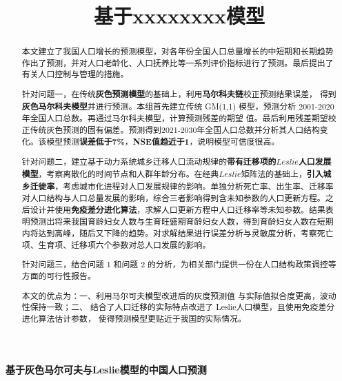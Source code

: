 \documentclass{whutmod}
\title{基于xxxxxxxx模型}
\begin{document}

\begin{center}
	\vspace{4pt}
	{\normalfont \LARGE \textbf{基于灰色马尔可夫与Leslie模型的中国人口预测} }\par
	\vspace{4pt}
	\noindent
\end{center}

	\begin{abstract}
		本文建立了我国人口增长的预测模型，对各年份全国人口总量增长的中短期和长期趋势作出了预测，并对人口老龄化、人口抚养比等一系列评价指标进行了预测。最后提出了有关人口控制与管理的措施。
		\vspace{7pt}	%
		
		针对问题一，在传统\textbf{灰色预测模型}的基础上，利用\textbf{马尔科夫链}校正预测结果误差， 得到\textbf{灰色马尔科夫模型}并进行预测。本组首先建立传统 GM(1,1) 模型，预测分析 2001-2020 年全国人口总数。再通过马尔科夫模型，计算预测残差的期望 值。最后利用残差期望校正传统灰色预测的固有偏差。预测得到2021-2030年全国人口总数并分析其人口结构变化。该模型预测\textbf{误差低于7\%}，\textbf{NSE值趋近于1}，说明模型可信度很高。
	
		\vspace{7pt}	%
	
		针对问题二，建立基于动力系统城乡迁移人口流动规律的\textbf{带有迁移项的$Leslie$人口发展模型}，考察离散化的时间节点和人群年龄分布。在经典$Leslie$矩阵法的基础上，\textbf{引入城乡迁徙率}，考虑城市化进程对人口发展规律的影响。单独分析死亡率、出生率、迁移率对人口结构与人口总量发展的影响，综合三者影响得到含未知参数的人口更新方程。之后设计并使用\textbf{免疫差分进化算法}，求解人口更新方程中人口迁移率等未知参数。结果表明预测出将来我国育龄妇女人数与生育旺盛期育龄妇女人数，得到育龄妇女人数在短期内将达到高峰，随后又下降的趋势。对求解结果进行误差分析与灵敏度分析，考察死亡项、生育项、迁移项六个参数对总人口发展的影响。
		\vspace{7pt}	%
	
		针对问题三，结合问题 1 和问题 2 的分析，为相关部门提供一份在人口结构政策调控等方面的可行性报告。
		\vspace{7pt}	%
	
		本文的优点为：一、利用马尔可夫模型改进后的灰度预测值 与实际值拟合度更高，波动性保持一致；二、 结合了人口迁移的实际特点改进了 Leslie人口模型，且使用免疫差分进化算法估计参数， 使得预测模型更贴近于我国的实际情况。
		
	\end{abstract}
\end{document}
